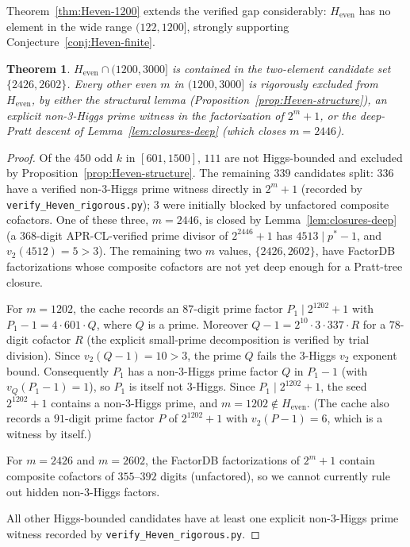 \documentclass[11pt]{amsart}
\theoremstyle{plain}
\newtheorem{theorem}{Theorem}
\theoremstyle{definition}
\begin{document}
Theorem~\ref{thm:Heven-1200} extends the verified gap considerably:
$H_{\mathrm{even}}$ has no element in the wide range $(122, 1200]$,
strongly supporting Conjecture~\ref{conj:Heven-finite}.

\begin{theorem}\label{thm:Heven-3000}
$H_{\mathrm{even}} \cap (1200, 3000]$ is contained in the two-element
candidate set $\{2426, 2602\}$. Every other even $m$ in $(1200, 3000]$
is rigorously excluded from $H_{\mathrm{even}}$, by either the
structural lemma (Proposition~\ref{prop:Heven-structure}), an
explicit non-3-Higgs prime witness in the factorization of $2^m + 1$,
or the deep-Pratt descent of Lemma~\ref{lem:closures-deep} (which
closes $m = 2446$).
\end{theorem}

\begin{proof}
Of the $450$ odd $k$ in $[601, 1500]$, $111$ are not Higgs-bounded
and excluded by Proposition~\ref{prop:Heven-structure}. The remaining
$339$ candidates split: $336$ have a verified non-3-Higgs prime
witness directly in $2^m + 1$ (recorded by
\texttt{verify\_Heven\_rigorous.py}); $3$ were initially blocked by
unfactored composite cofactors. One of these three, $m = 2446$, is
closed by Lemma~\ref{lem:closures-deep} (a $368$-digit
APR-CL-verified prime divisor of $2^{2446}+1$ has $4513 \mid p^{*}-1$,
and $v_2(4512) = 5 > 3$). The remaining two $m$ values, $\{2426, 2602\}$,
have FactorDB factorizations whose composite cofactors are not yet
deep enough for a Pratt-tree closure.

For $m = 1202$, the cache records an $87$-digit prime factor
$P_1 \mid 2^{1202}+1$ with
$P_1 - 1 = 4 \cdot 601 \cdot Q$, where $Q$ is a prime. Moreover
$Q - 1 = 2^{10} \cdot 3 \cdot 337 \cdot R$ for a $78$-digit cofactor
$R$ (the explicit small-prime decomposition is verified by trial
division). Since $v_2(Q-1) = 10 > 3$, the prime $Q$ fails the 3-Higgs
$v_2$ exponent bound. Consequently $P_1$ has a non-3-Higgs prime
factor $Q$ in $P_1 - 1$ (with $v_Q(P_1-1) = 1$), so $P_1$ is itself
not 3-Higgs. Since $P_1 \mid 2^{1202}+1$, the seed $2^{1202}+1$
contains a non-3-Higgs prime, and $m = 1202 \notin H_{\mathrm{even}}$.
(The cache also records a $91$-digit prime factor $P$ of $2^{1202}+1$ with
$v_2(P-1)=6$, which is a witness by itself.)

For $m = 2426$ and $m = 2602$, the FactorDB factorizations of
$2^m + 1$ contain composite cofactors of $355$--$392$ digits
(unfactored), so we cannot currently rule out hidden non-3-Higgs
factors.

All other Higgs-bounded candidates have at least one explicit
non-3-Higgs prime witness recorded by
\texttt{verify\_Heven\_rigorous.py}.
\end{proof}
\end{document}
